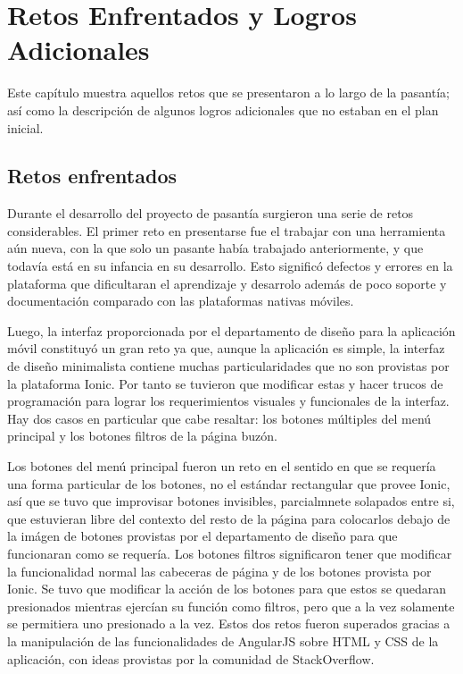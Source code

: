 \chapter{Retos Enfrentados y Logros Adicionales}\label{chapter:Retos y logros}

Este capítulo muestra aquellos retos que se presentaron a lo largo de la pasantía; así como la descripción de algunos logros adicionales que no estaban en el plan inicial.

\section{Retos enfrentados} \label{sect:Retos}
Durante el desarrollo del proyecto de pasantía surgieron una serie de retos considerables. El primer reto en presentarse fue el trabajar con una herramienta aún nueva, con la que solo un pasante había trabajado anteriormente, y que todavía está en su infancia en su desarrollo. Esto significó defectos y errores en la plataforma que dificultaran el aprendizaje y desarrolo además de poco soporte y documentación comparado con las plataformas nativas móviles.

Luego, la interfaz proporcionada por el departamento de diseño para la aplicación móvil constituyó un gran reto ya que, aunque la aplicación es simple, la interfaz de diseño minimalista contiene muchas particularidades que no son provistas por la plataforma Ionic. Por tanto se tuvieron que modificar estas y hacer trucos de programación para lograr los requerimientos visuales y funcionales de la interfaz. Hay dos casos en particular que cabe resaltar: los botones múltiples del menú principal y los botones filtros de la página buzón.

Los botones del menú principal fueron un reto en el sentido en que se requería una forma particular de los botones, no el estándar rectangular que provee Ionic, así que se tuvo que improvisar botones invisibles, parcialmnete solapados entre si, que estuvieran libre del contexto del resto de la página para colocarlos debajo de la imágen de botones provistas por el departamento de diseño para que funcionaran como se requería. Los botones filtros significaron tener que modificar la funcionalidad normal las cabeceras de página y de los botones provista por Ionic. Se tuvo que modificar la acción de los botones para que estos se quedaran presionados mientras ejercían su función como filtros, pero que a la vez solamente se permitiera uno presionado a la vez. Estos dos retos fueron superados gracias a la manipulación de las funcionalidades de AngularJS sobre HTML y CSS de la aplicación, con ideas provistas por la comunidad de StackOverflow.

